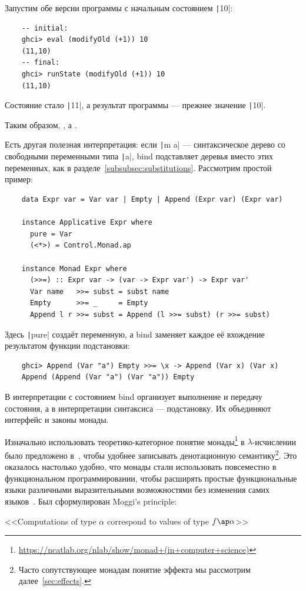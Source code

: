 Запустим обе версии программы с начальным состоянием \texttt|10|:
\begin{verbatim}
    -- initial:
    ghci> eval (modifyOld (+1)) 10
    (11,10)
    -- final:
    ghci> runState (modifyOld (+1)) 10
    (11,10)
\end{verbatim}
Состояние стало \texttt|11|, а результат программы --- прежнее значение \texttt|10|.

Таким образом, , а .

Есть другая полезная интерпретация: если \texttt|m a| --- синтаксическое дерево со свободными переменными типа \texttt|a|, bind подставляет деревья вместо этих переменных, как в разделе~\ref{subsubsec:substitutions}.
Рассмотрим простой пример:
\begin{verbatim}
    data Expr var = Var var | Empty | Append (Expr var) (Expr var)

    instance Applicative Expr where
      pure = Var
      (<*>) = Control.Monad.ap

    instance Monad Expr where
      (>>=) :: Expr var -> (var -> Expr var') -> Expr var'
      Var name   >>= subst = subst name
      Empty      >>= _     = Empty
      Append l r >>= subst = Append (l >>= subst) (r >>= subst)
\end{verbatim}

Здесь \texttt|pure| создаёт переменную, а bind заменяет каждое её вхождение результатом функции подстановки:
\begin{verbatim}
    ghci> Append (Var "a") Empty >>= \x -> Append (Var x) (Var x)
    Append (Append (Var "a") (Var "a")) Empty
\end{verbatim}
В интерпретации с состоянием bind организует выполнение и передачу состояния, а в интерпретации синтаксиса --- подстановку.
Их объединяют интерфейс и законы монады.

Изначально использовать теоретико-категорное понятие монады\footnote{\url{https://ncatlab.org/nlab/show/monad+(in+computer+science)}} в $\lambda$-исчислении было предложено в~\cite{moggi1988computational}, чтобы удобнее записывать денотационную семантику\footnote{Часто сопутствующее монадам понятие эффекта мы рассмотрим далее~\ref{sec:effects}.}.
Это оказалось настолько удобно, что монады стали использовать повсеместно в функциональном программировании, чтобы расширять простые функциональные языки различными выразительными возможностями без изменения самих языков~\cite{wadler1990comprehending, wadler1992essence}.
Был сформулирован Moggi's principle:
\begin{center}
    <<Computations of type $\alpha$ correspond to values of type $f\ap\alpha$>>
\end{center}

